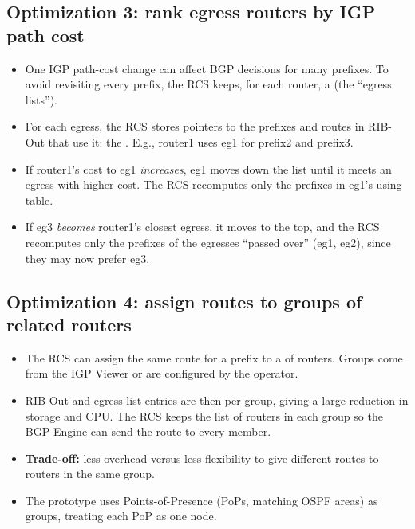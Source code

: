 \subsection{Optimization 3: rank egress routers by IGP path cost}
\begin{itemize}
\item One IGP path-cost change can affect BGP decisions for many prefixes. To avoid revisiting every prefix, the RCS keeps, for each router, a  (the ``egress lists'').
\item For each egress, the RCS stores pointers to the prefixes and routes in RIB-Out that use it: the . E.g., router1 uses eg1 for prefix2 and prefix3.
\item If router1's cost to eg1 \emph{increases}, eg1 moves down the list until it meets an egress with higher cost. The RCS recomputes only the prefixes in eg1's using table.
\item If eg3 \emph{becomes} router1's closest egress, it moves to the top, and the RCS recomputes only the prefixes of the egresses ``passed over'' (eg1, eg2), since they may now prefer eg3.
\end{itemize}

\subsection{Optimization 4: assign routes to groups of related routers}
\begin{itemize}
\item The RCS can assign the same route for a prefix to a  of routers. Groups come from the IGP Viewer or are configured by the operator.
\item RIB-Out and egress-list entries are then per group, giving a large reduction in storage and CPU. The RCS keeps the list of routers in each group so the BGP Engine can send the route to every member.
\item \textbf{Trade-off:} less overhead versus less flexibility to give different routes to routers in the same group.
\item The prototype uses Points-of-Presence (PoPs, matching OSPF areas) as groups, treating each PoP as one node.
\end{itemize}

